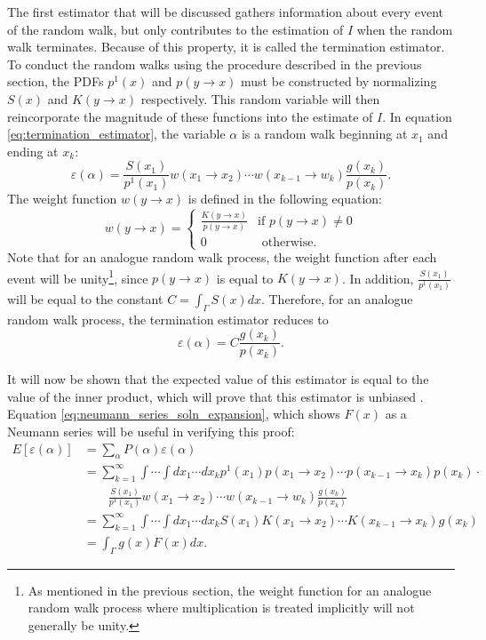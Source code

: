 The first estimator that will be discussed gathers information about every
event of the random walk, but only contributes to the estimation of $I$ when
the random walk terminates. Because of this property, it is called the
termination estimator. To conduct the random walks using the procedure
described in the previous section, the PDFs $p^1(x)$ and $p(y \to x)$ must be 
constructed by normalizing $S(x)$ and $K(y \to x)$ respectively. This random
variable will then reincorporate the magnitude of these functions into
the estimate of $I$. In equation \ref{eq:termination_estimator}, the variable 
$\alpha$ is a random walk beginning at $x_1$ and ending at $x_k$: 
\begin{equation}
  \varepsilon(\alpha) = \frac{S(x_1)}{p^1(x_1)}w(x_1 \to x_2)\cdots 
  w(x_{k-1} \to w_k)\frac{g(x_k)}{p(x_k)}.
  \label{eq:termination_estimator}
\end{equation}
The weight function $w(y \to x)$ is defined in the following equation:
\begin{equation}
  w(y \to x) = 
  \begin{cases}
    \frac{K(y \to x)}{p(y \to x)} & \text{if } p(y \to x) \neq 0 \\
    0 & \text{ otherwise}.
  \end{cases}
\end{equation}
Note that for an analogue random walk process, the weight function after each
event will be unity\footnote{As mentioned in the previous section, the weight
function for an analogue random walk process where multiplication is treated 
implicitly will not generally be unity.}, since $p(y \to x)$ is equal to 
$K(y \to x)$. In addition, $\frac{S(x_1)}{p^1(x_1)}$ will be equal to the 
constant $C = \int_{\Gamma} S(x)dx$. Therefore, for an analogue random walk 
process, the termination estimator reduces to
\begin{equation*}
  \varepsilon(\alpha) = C \frac{g(x_k)}{p(x_k)}.
\end{equation*}

It will now be shown that the expected value of this estimator is equal to the 
value of the inner product, which will prove that this estimator is unbiased 
\citep{spanier_monte_1969}. Equation \ref{eq:neumann_series_soln_expansion},
which shows $F(x)$ as a Neumann series will be useful in verifying this proof:
\begin{align}
  E\left[\varepsilon(\alpha)\right] & = \sum_{\alpha} 
  P(\alpha)\varepsilon(\alpha) \nonumber \\
  & = \sum_{k=1}^{\infty} \int \cdots \int dx_1 \cdots dx_k p^1(x_1)
  p(x_1 \to x_2) \cdots p(x_{k-1} \to x_k)p(x_k) \cdot \nonumber \\
  & \qquad \frac{S(x_1)}{p^1(x_1)}w(x_1 \to x_2)\cdots 
  w(x_{k-1} \to w_k)\frac{g(x_k)}{p(x_k)} \nonumber \\
  & = \sum_{k=1}^{\infty} \int \cdots \int dx_1 \cdots dx_k S(x_1)K(x_1 \to x_2)
  \cdots K(x_{k-1} \to x_k)g(x_k) \nonumber \\
  & = \int_{\Gamma} g(x)F(x)dx \nonumber.
\end{align}

